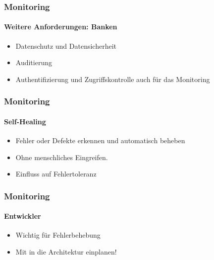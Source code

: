 \begin{frame}
  \frametitle{Monitoring}
  \framesubtitle{Weitere Anforderungen: Banken}
  \begin{itemize}
    \item Datenschutz und Datensicherheit
    \item Auditierung
    \item Authentifizierung und Zugriffskontrolle auch für das Monitoring
  \end{itemize}
\end{frame}

\begin{frame}
  \frametitle{Monitoring}
  \framesubtitle{Self-Healing}
  \begin{itemize}
    \item Fehler oder Defekte erkennen und automatisch beheben
    \item Ohne menschliches Eingreifen.
    \item Einfluss auf Fehlertoleranz
  \end{itemize}
\end{frame}

\begin{frame}
  \frametitle{Monitoring}
  \framesubtitle{Entwickler}
  \begin{itemize}
    \item Wichtig für Fehlerbehebung
    \item Mit in die Architektur einplanen!
  \end{itemize}
\end{frame}